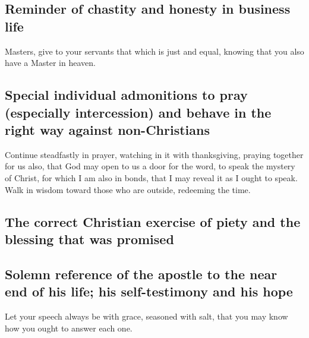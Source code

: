 \hypertarget{reminder-of-chastity-and-honesty-in-business-life}{%
\subsection{Reminder of chastity and honesty in business
life}\label{reminder-of-chastity-and-honesty-in-business-life}}

 Masters, give to your servants that which is just and
equal, knowing that you also have a Master in heaven.

\hypertarget{special-individual-admonitions-to-pray-especially-intercession-and-behave-in-the-right-way-against-non-christians}{%
\subsection{Special individual admonitions to pray (especially
intercession) and behave in the right way against
non-Christians}\label{special-individual-admonitions-to-pray-especially-intercession-and-behave-in-the-right-way-against-non-christians}}

 Continue steadfastly in prayer, watching in it with
thanksgiving,  praying together for us also, that God may
open to us a door for the word, to speak the mystery of Christ, for
which I am also in bonds,  that I may reveal it as I ought
to speak.  Walk in wisdom toward those who are outside,
redeeming the time.

\hypertarget{the-correct-christian-exercise-of-piety-and-the-blessing-that-was-promised}{%
\subsection{The correct Christian exercise of piety and the blessing
that was
promised}\label{the-correct-christian-exercise-of-piety-and-the-blessing-that-was-promised}}

\hypertarget{solemn-reference-of-the-apostle-to-the-near-end-of-his-life-his-self-testimony-and-his-hope}{%
\subsection{Solemn reference of the apostle to the near end of his life;
his self-testimony and his
hope}\label{solemn-reference-of-the-apostle-to-the-near-end-of-his-life-his-self-testimony-and-his-hope}}

 Let your speech always be with grace, seasoned with salt,
that you may know how you ought to answer each one.

